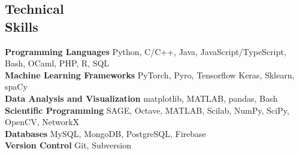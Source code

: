 \documentclass[margin, 10pt]{res}
\newcommand{\field}[2]{\noindent \textbf{#1} \hfill #2 \\}
\begin{document}
\begin{resume}


\begin{comment}
\section{Data \\ Analysis \& \\ Visualization \\ Tools} 
\begin{compactitem}
\item[--] Python 
\item[--] Bash 
\item[--] MATLAB 
\item[--] GNU Octave 
\item[--] R
\item[--] Matplotlib 
\item[--] GNUPlot 
\item[--] Pandas
\item[--] Seaborn
\item[--] MySQL 
\item[--] MongoDB 
\end{compactitem}
\end{comment}

\section{Technical \\ Skills}

\field{Programming Languages}  {Python, C/C++, Java, JavaScript/TypeScript, Bash, OCaml, PHP, R, SQL  } 
\field{Machine Learning Frameworks}  {PyTorch, Pyro, Tensorflow Keras, Sklearn, spaCy } 
\field{Data Analysis and Visualization} {matplotlib, MATLAB, pandas, Bash } 
\field{Scientific Programming} {SAGE, Octave, MATLAB, Scilab, NumPy, SciPy, OpenCV, NetworkX} 
\field{Databases} {MySQL, MongoDB, PostgreSQL, Firebase}
\field{Version Control} {Git, Subversion}

\end{resume}
\end{document}
